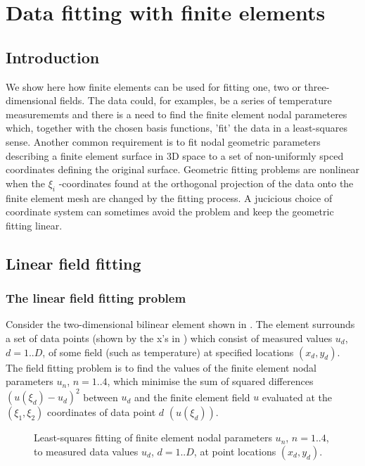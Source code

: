 
\chapter{Data fitting with finite elements}
\label{cha:datafitting}


\section{Introduction}

We show here how finite elements can be used for fitting one, two or
three-dimensional fields. The data could, for examples, be a series of
temperature measurememts and there is a need to find the finite element nodal
parameteres which, together with the chosen basis functions, 'fit' the data in
a least-squares sense. Another common requirement is to fit nodal geometric
parameters describing a finite element surface in 3D space to a set of
non-uniformly spced coordinates defining the original surface. Geometric
fitting problems are nonlinear when the $\xi_i$ -coordinates found at the
orthogonal projection of the data onto the finite element mesh are changed by
the fitting process. A jucicious choice of coordinate system can sometimes
avoid the problem and keep the geometric fitting linear.

\section{Linear field fitting}
\label{sec:linearfieldfitting}

\subsection{The linear field fitting problem}

Consider the two-dimensional bilinear element shown in
. The element surrounds a set of data points (shown by
the x's in ) which consist of measured values $u_{d}$,
$d=1..D$, of some field (such as temperature) at specified locations
$(x_{d}, y_{d})$. The field fitting problem is to find the values of the
finite element nodal parameters $u_{n}$, $n=1..4$, which minimise the sum of
squared differences $(u(\xi_{d})-u_{d})^{2}$ between $u_{d}$ and the finite
element field $u$ evaluated at the $(\xi_{1},\xi_{2})$ coordinates of data
point $d$ $(u(\xi_{d}))$.

\begin{figure}[htpb] \centering
  
  \caption{Least-squares fitting of finite element nodal parameters $u_{n}$,
    $n=1..4$, to measured data values $u_{d}$, $d=1..D$, at point locations
    $(x_{d}, y_{d})$.}
  \label{fig:linfieldfit}
\end{figure}

